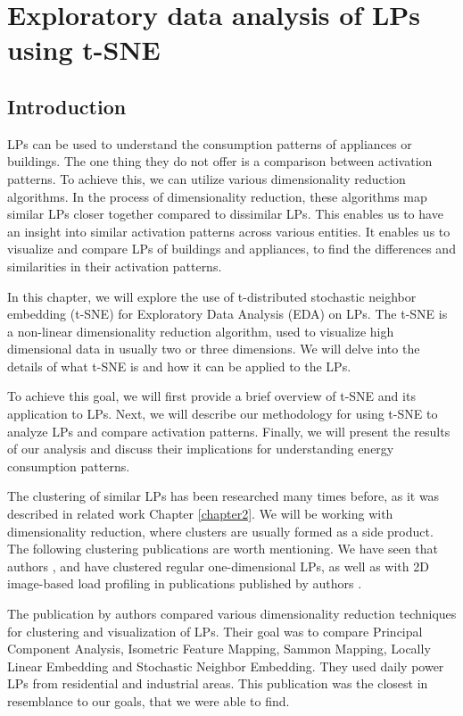 \chapter{Exploratory data analysis of LPs using t-SNE} 

\label{chapter5} 

\section{Introduction}

LPs can be used to understand the consumption patterns of appliances or buildings. 
The one thing they do not offer is a comparison between activation patterns.
To achieve this, we can utilize various dimensionality reduction algorithms. 
In the process of dimensionality reduction, these algorithms map similar LPs closer together compared to dissimilar LPs. 
This enables us to have an insight into similar activation patterns across various entities. 
It enables us to visualize and compare LPs of buildings and appliances, to find the differences and similarities in their activation patterns.

In this chapter, we will explore the use of t-distributed stochastic neighbor embedding (t-SNE) for Exploratory Data Analysis (EDA) on LPs.
The t-SNE is a non-linear dimensionality reduction algorithm, used to visualize high dimensional data in usually two or three dimensions.
We will delve into the details of what t-SNE is and how it can be applied to the LPs.

To achieve this goal, we will first provide a brief overview of t-SNE and its application to LPs. 
Next, we will describe our methodology for using t-SNE to analyze LPs and compare activation patterns. 
Finally, we will present the results of our analysis and discuss their implications for understanding energy consumption patterns.

The clustering of similar LPs has been researched many times before, as it was described in related work Chapter \ref{chapter2}. 
We will be working with dimensionality reduction, where clusters are usually formed as a side product. 
The following clustering publications are worth mentioning. 
We have seen that authors \cite{GERBEC2005}, \cite{Jeong2021} and \cite{Joana2012} have clustered regular one-dimensional LPs, as well as with 2D image-based load profiling in publications published by authors \cite{Park2019}.

The publication by authors \cite{sne_energ} compared various dimensionality reduction techniques for clustering and visualization of LPs.
Their goal was to compare Principal Component Analysis, Isometric Feature Mapping, Sammon Mapping, Locally Linear Embedding and Stochastic Neighbor Embedding.
They used daily power LPs from residential and industrial areas. 
This publication was the closest in resemblance to our goals, that we were able to find.

